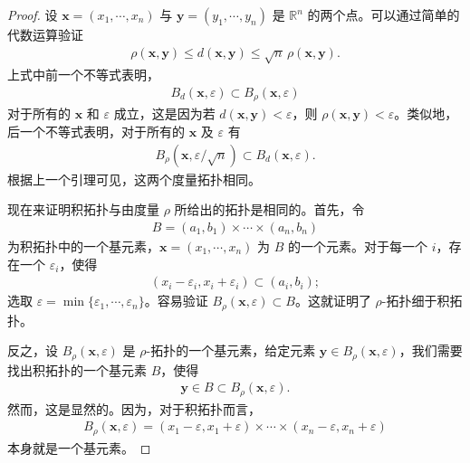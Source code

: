 \documentclass[../../main.tex]{subfiles}
\begin{document}
\begin{proof}
设 $\boldsymbol{x} = (x_{1}, \cdots, x_{n})$ 与 $\boldsymbol{y} = (y_{1}, \cdots, y_{n})$ 是 $\mathbb{R}^{n}$ 的两个点。可以通过简单的代数运算验证
\begin{align*}
\rho(\boldsymbol{x}, \boldsymbol{y}) \leqslant d(\boldsymbol{x}, \boldsymbol{y}) \leqslant \sqrt{n}\, \rho(\boldsymbol{x}, \boldsymbol{y}).
\end{align*}
上式中前一个不等式表明，
\begin{align*}
B_{d}(\boldsymbol{x}, \varepsilon) \subset B_{\rho}(\boldsymbol{x}, \varepsilon)
\end{align*}
对于所有的 $\boldsymbol{x}$ 和 $\varepsilon$ 成立，这是因为若 $d(\boldsymbol{x}, \boldsymbol{y}) < \varepsilon$，则 $\rho(\boldsymbol{x}, \boldsymbol{y}) < \varepsilon$。类似地，后一个不等式表明，对于所有的 $\boldsymbol{x}$ 及 $\varepsilon$ 有
\begin{align*}
B_{\rho}(\boldsymbol{x}, \varepsilon/\sqrt{n}) \subset B_{d}(\boldsymbol{x}, \varepsilon).
\end{align*}
根据上一个引理可见，这两个度量拓扑相同。

现在来证明积拓扑与由度量 $\rho$ 所给出的拓扑是相同的。首先，令
\begin{align*}
B = (a_{1}, b_{1}) \times \cdots \times (a_{n}, b_{n})
\end{align*}
为积拓扑中的一个基元素，$\boldsymbol{x} = (x_{1}, \cdots, x_{n})$ 为 $B$ 的一个元素。对于每一个 $i$，存在一个 $\varepsilon_{i}$，使得
\begin{align*}
(x_{i} - \varepsilon_{i}, x_{i} + \varepsilon_{i}) \subset (a_{i}, b_{i});
\end{align*}
选取 $\varepsilon = \min \{\varepsilon_{1}, \cdots, \varepsilon_{n}\}$。容易验证 $B_{\rho}(\boldsymbol{x}, \varepsilon) \subset B$。这就证明了 $\rho$-拓扑细于积拓扑。

反之，设 $B_{\rho}(\boldsymbol{x}, \varepsilon)$ 是 $\rho$-拓扑的一个基元素，给定元素 $\boldsymbol{y} \in B_{\rho}(\boldsymbol{x}, \varepsilon)$，我们需要找出积拓扑的一个基元素 $B$，使得
\begin{align*}
\boldsymbol{y} \in B \subset B_{\rho}(\boldsymbol{x}, \varepsilon).
\end{align*}
然而，这是显然的。因为，对于积拓扑而言，
\begin{align*}
B_{\rho}(\boldsymbol{x}, \varepsilon) = (x_{1} - \varepsilon, x_{1} + \varepsilon) \times \cdots \times (x_{n} - \varepsilon, x_{n} + \varepsilon)
\end{align*}
本身就是一个基元素。
\end{proof}
\end{document}
